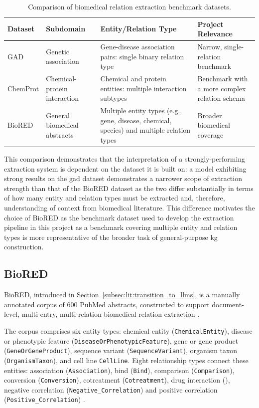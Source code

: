 \begin{table}[H]
    \centering
    \caption{Comparison of biomedical relation extraction benchmark datasets.}
    \label{tab:re-performance}
    \begin{tabularx}{\textwidth}{l Y Y Y}
        \toprule
        Dataset & Subdomain & Entity/Relation Type & Project Relevance \\
        \midrule
        GAD \cite{bravo2015extraction}
        & Genetic association
        & Gene-disease association pairs: single binary relation type
        & Narrow, single-relation benchmark \\
        ChemProt \cite{krallinger2017overview}
        & Chemical-protein interaction
        & Chemical and protein entities: multiple interaction subtypes
        & Benchmark with a more complex relation schema \\
        BioRED \cite{luo2022_biored}
        & General biomedical abstracts
        & Multiple entity types (e.g., gene, disease, chemical, species) and multiple relation types
        & Broader biomedical coverage \\
        \bottomrule
    \end{tabularx}
\end{table}

This comparison demonstrates that the interpretation of a strongly-performing extraction system is dependent on the dataset it is built on: a model exhibiting strong results on the \gls{gad} dataset demonstrates a narrower scope of extraction strength than that of the BioRED dataset as the two differ substantially in terms of how many entity and relation types must be extracted and, therefore, understanding of context from biomedical literature. This difference motivates the choice of BioRED as the benchmark dataset used to develop the extraction pipeline in this project as a benchmark covering multiple entity and relation types is more representative of the broader task of general-purpose \gls{kg} construction.

\subsection{BioRED}
\label{subsec:lit:biored}
BioRED, introduced in Section~\ref{subsec:lit:transition_to_llms}, is a manually annotated corpus of 600 PubMed abstracts, constructed to support document-level, multi-entry, multi-relation biomedical relation extraction \pref.

The corpus comprises six entity types: chemical entity (\verb|ChemicalEntity|), disease or phenotypic feature (\verb|DiseaseOrPhenotypicFeature|), gene or gene product (\verb|GeneOrGeneProduct|), sequence variant (\verb|SequenceVariant|), organism taxon (\verb|OrganismTaxon|), and cell line \verb|CellLine|. Eight relationship types connect these entities: association (\verb|Association|), bind (\verb|Bind|), comparison (\verb|Comparison|), conversion (\verb|Conversion|), cotreatment (\verb|Cotreatment|), drug interaction (\texttt{}), negative correlation (\verb|Negative_Correlation|) and positive correlation (\verb|Positive_Correlation|) \cite{luo2022_biored}.

